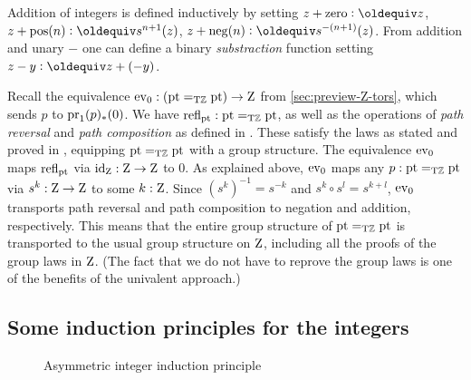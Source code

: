 \documentclass[a4paper,12pt]{amsart}
\begin{document}
Addition of integers is defined inductively by setting
$z + \zzero\defeq z$,
$z + \zpos(n)\defeq s^{n+1}(z)$,
$z + \zneg(n)\defeq s^{-(n+1)}(z)$.
From addition and unary $-$ one can define a binary
\emph{substraction} function setting $z-y \defeq z+(-y)$.


Recall the equivalence $\mathrm{ev}_0 : ({\mathord{\mathrm{pt}}}=_{\mathrm{T}\mathbb{Z}} {\mathord{\mathrm{pt}}})\to\mathrm{Z}$ from
\cref{sec:preview-Z-tors}, which sends $p$ to $\operatorname{pr}_1(p)_*(0)$.
We have $\mathop{{\mathrm{refl}}_{{\mathord{\mathrm{pt}}}}} : {\mathord{\mathrm{pt}}}=_{\mathrm{T}\mathbb{Z}} {\mathord{\mathrm{pt}}}$, as well as the operations
of \emph{path reversal} and \emph{path composition} as defined
in \cite[2.1]{hottbook}. These satisfy the laws as stated
and proved in \cite[Lemma 2.1.4]{hottbook}, equipping ${\mathord{\mathrm{pt}}}=_{\mathrm{T}\mathbb{Z}} {\mathord{\mathrm{pt}}}$
with a group structure.
The equivalence $\mathrm{ev}_0$ maps $\mathop{{\mathrm{refl}}_{{\mathord{\mathrm{pt}}}}}$ via $\mathord{\mathrm{id}}_{\mathrm{Z}} : \mathrm{Z}\to\mathrm{Z}$ to $0$.
As explained above, $\mathrm{ev}_0$ maps any $p : {\mathord{\mathrm{pt}}}=_{\mathrm{T}\mathbb{Z}} {\mathord{\mathrm{pt}}}$
via $s^k : \mathrm{Z}\to\mathrm{Z}$ to some $k:\mathrm{Z}$. Since $(s^k)^{-1} = s^{-k}$
and $s^k \circ s^l = s^{k+l}$, $\mathrm{ev}_0$ transports path reversal
and path composition to negation and addition, respectively.
This means that the entire group structure of ${\mathord{\mathrm{pt}}}=_{\mathrm{T}\mathbb{Z}} {\mathord{\mathrm{pt}}}$
is transported to the usual group structure on $\mathrm{Z}$,
including all the proofs of the group laws in $\mathrm{Z}$.
(The fact that we do not have to reprove the group laws
is one of the benefits of the univalent approach.)


\subsection{Some induction principles for the integers}
\label{sec:integers-induction}

\begin{figure}[b]
  \centering
  \caption{Asymmetric integer induction principle}
  \label{fig:integers-induction-asymmetric}
\end{figure}
\end{document}
